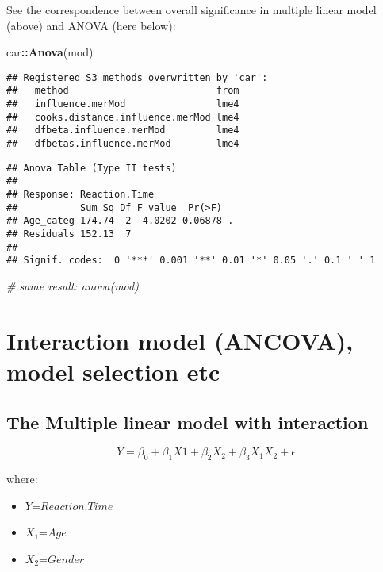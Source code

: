 \documentclass[
]{article}
\newenvironment{Shaded}{\begin{snugshade}}{\end{snugshade}}
\newcommand{\CommentTok}[1]{\textcolor[rgb]{0.56,0.35,0.01}{\textit{#1}}}
\newcommand{\KeywordTok}[1]{\textcolor[rgb]{0.13,0.29,0.53}{\textbf{#1}}}
\newcommand{\NormalTok}[1]{#1}
\newcommand{\OperatorTok}[1]{\textcolor[rgb]{0.81,0.36,0.00}{\textbf{#1}}}
\providecommand{\tightlist}{%
  \setlength{\itemsep}{0pt}\setlength{\parskip}{0pt}}
\begin{document}
See the correspondence between overall significance in multiple linear
model (above) and ANOVA (here below):

\begin{Shaded}
\begin{Highlighting}[]
\NormalTok{car}\OperatorTok{::}\KeywordTok{Anova}\NormalTok{(mod)}
\end{Highlighting}
\end{Shaded}

\begin{verbatim}
## Registered S3 methods overwritten by 'car':
##   method                          from
##   influence.merMod                lme4
##   cooks.distance.influence.merMod lme4
##   dfbeta.influence.merMod         lme4
##   dfbetas.influence.merMod        lme4
\end{verbatim}

\begin{verbatim}
## Anova Table (Type II tests)
## 
## Response: Reaction.Time
##           Sum Sq Df F value  Pr(>F)  
## Age_categ 174.74  2  4.0202 0.06878 .
## Residuals 152.13  7                  
## ---
## Signif. codes:  0 '***' 0.001 '**' 0.01 '*' 0.05 '.' 0.1 ' ' 1
\end{verbatim}

\begin{Shaded}
\begin{Highlighting}[]
\CommentTok{# same result: anova(mod)}
\end{Highlighting}
\end{Shaded}

\hypertarget{interaction-model-ancova-model-selection-etc}{%
\section{Interaction model (ANCOVA), model selection
etc}\label{interaction-model-ancova-model-selection-etc}}

\hypertarget{the-multiple-linear-model-with-interaction}{%
\subsection{The Multiple linear model with
interaction}\label{the-multiple-linear-model-with-interaction}}

\[
Y = {\beta} _{0} + {\beta} _{1} X {1} + \beta_{2} X_{2} + \beta_{3} X_{1} X_{2} + \epsilon
\]

where:

\begin{itemize}
\tightlist
\item
  \(Y\)=\(Reaction.Time\)\\
\item
  \(X_{1}\)=\(Age\)\\
\item
  \(X_{2}\)=\(Gender\)
\end{itemize}
\end{document}
